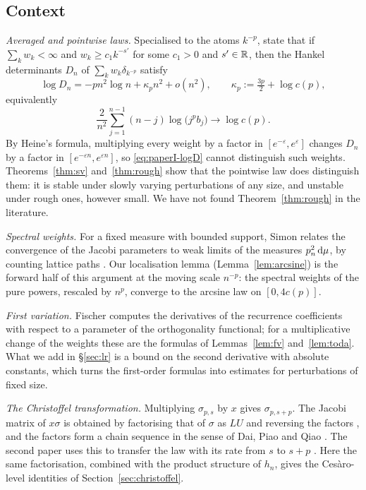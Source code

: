\subsection{Context}\label{sec:context}
\emph{Averaged and pointwise laws.} Specialised to the atoms $k^{-p}$, \cite[Theorem~1.1 and Corollary~1.2]{PaperI}
state that if $\sum_kw_k<\infty$ and $w_k\ge c_1k^{-s'}$ for some $c_1>0$ and $s'\in\mathbb{R}$, then the Hankel
determinants $D_n$ of $\sum_kw_k\delta_{k^{-p}}$ satisfy
\begin{equation}\label{eq:paperI-logD}
  \log D_n=-pn^2\log n+\kappa_pn^2+o(n^2),\qquad \kappa_p:=\tfrac{3p}2+\log c(p),
\end{equation}
equivalently
\begin{equation}\label{eq:paperI-cesaro}
  \frac2{n^2}\sum_{j=1}^{n-1}(n-j)\log\bigl(j^pb_j\bigr)\longrightarrow\log c(p).
\end{equation}
By Heine's formula, multiplying every weight by a factor in $[e^{-\varepsilon},e^{\varepsilon}]$ changes $D_n$ by a
factor in $[e^{-\varepsilon n},e^{\varepsilon n}]$, so \eqref{eq:paperI-logD} cannot distinguish such weights.
Theorems~\ref{thm:sv} and~\ref{thm:rough} show that the pointwise law does distinguish them: it is stable under
slowly varying perturbations of any size, and unstable under rough ones, however small. We have not found
Theorem~\ref{thm:rough} in the literature.

\emph{Spectral weights.} For a fixed measure with bounded support, Simon \cite[Theorems~3.1 and~3.2]{Simon} relates
the convergence of the Jacobi parameters to weak limits of the measures $p_n^2\,\mathrm{d}\mu$, by counting lattice paths
\cite[Proposition~3.3]{Simon}. Our localisation lemma (Lemma~\ref{lem:arcsine}) is the forward half of this argument
at the moving scale $n^{-p}$: the spectral weights of the pure powers, rescaled by $n^p$, converge to the arcsine law
on $[0,4c(p)]$.

\emph{First variation.} Fischer \cite[Lemma~4, (20)--(21)]{Fischer} computes the derivatives of the recurrence
coefficients with respect to a parameter of the orthogonality functional; for a multiplicative change of the weights
these are the formulas of Lemmas~\ref{lem:fv} and~\ref{lem:toda}. What we add in \S\ref{sec:lr} is a bound on the
second derivative with absolute constants, which turns the first-order formulas into estimates for perturbations of
fixed size.

\emph{The Christoffel transformation.} Multiplying $\sigma_{p,s}$ by $x$ gives $\sigma_{p,s+p}$. The Jacobi matrix of
$x\sigma$ is obtained by factorising that of $\sigma$ as $LU$ and reversing the factors \cite[\S1]{DD}, and the
factors form a chain sequence in the sense of Dai, Piao and Qiao \cite[Proposition~2.1]{DPQ}. The second paper
uses this to transfer the law with its rate from $s$ to $s+p$ \cite[Theorem~3.1]{PaperII}. Here the same
factorisation, combined with the product structure of $h_n$, gives the Ces\`aro-level identities of
Section~\ref{sec:christoffel}.

